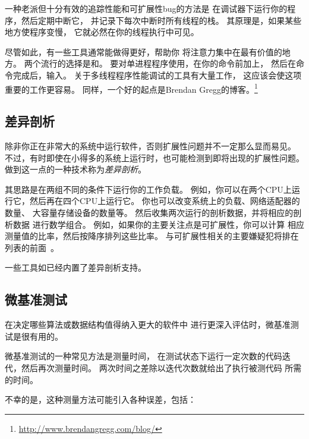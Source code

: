 一种老派但十分有效的追踪性能和可扩展性bug的方法是
在调试器下运行你的程序，然后定期中断它，
并记录下每次中断时所有线程的栈。
其原理是，如果某些地方使程序变慢，
它就必然在你的线程执行中可见。

尽管如此，有一些工具通常能做得更好，帮助你
将注意力集中在最有价值的地方。
两个流行的选择是和。
要对单进程程序使用，在你的命令前加上，
然后在命令完成后，输入。
关于多线程程序性能调试的工具有大量工作，
这应该会使这项重要的工作更容易。
同样，一个好的起点是Brendan Gregg的博客。\footnote{
	\url{http://www.brendangregg.com/blog/}}

\subsection{差异剖析}
\label{sec:debugging:Differential Profiling}

除非你正在非常大的系统中运行软件，否则扩展性问题并不一定那么显而易见。
不过，有时即使在小得多的系统上运行时，也可能检测到即将出现的扩展性问题。
做到这一点的一种技术称为\emph{差异剖析}。

其思路是在两组不同的条件下运行你的工作负载。
例如，你可以在两个CPU上运行它，然后再在四个CPU上运行它。
你也可以改变系统上的负载、网络适配器的数量、
大容量存储设备的数量等。
然后收集两次运行的剖析数据，并将相应的剖析数据
进行数学组合。
例如，如果你的主要关注点是可扩展性，你可以计算
相应测量值的比率，然后按降序排列这些比率。
与可扩展性相关的主要嫌疑犯将排在列表的前面~\cite{McKenney95a,McKenney99b}。

一些工具如已经内置了差异剖析支持。

\subsection{微基准测试}
\label{sec:debugging:Microbenchmarking}

在决定哪些算法或数据结构值得纳入更大的软件中
进行更深入评估时，微基准测试是很有用的。

微基准测试的一种常见方法是测量时间，
在测试状态下运行一定次数的代码迭代，然后再次测量时间。
两次时间之差除以迭代次数就给出了执行被测代码
所需的时间。

不幸的是，这种测量方法可能引入各种误差，包括：

